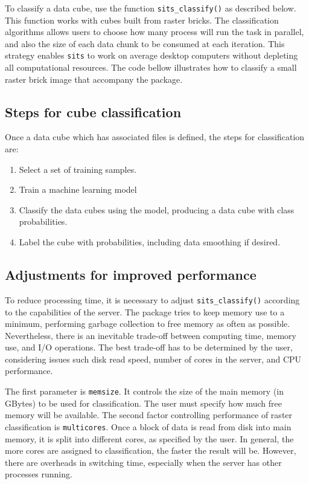 \documentclass[a4paper,]{tufte-book}
\providecommand{\tightlist}{%
  \setlength{\itemsep}{0pt}\setlength{\parskip}{0pt}}
\begin{document}
To classify a data cube, use the function \texttt{sits\_classify()} as described below. This function works with cubes built from raster bricks. The classification algorithms allows users to choose how many process will run the task in parallel, and also the size of each data chunk to be consumed at each iteration. This strategy enables \texttt{sits} to work on average desktop computers without depleting all computational resources. The code bellow illustrates how to classify a small raster brick image that accompany the package.

\hypertarget{steps-for-cube-classification}{%
\subsection{Steps for cube classification}\label{steps-for-cube-classification}}

Once a data cube which has associated files is defined, the steps for classification are:

\begin{enumerate}
\def\labelenumi{\arabic{enumi}.}
\tightlist
\item
  Select a set of training samples.
\item
  Train a machine learning model
\item
  Classify the data cubes using the model, producing a data cube with class probabilities.
\item
  Label the cube with probabilities, including data smoothing if desired.
\end{enumerate}

\hypertarget{adjustments-for-improved-performance}{%
\subsection{Adjustments for improved performance}\label{adjustments-for-improved-performance}}

To reduce processing time, it is necessary to adjust \texttt{sits\_classify()} according to the capabilities of the server. The package tries to keep memory use to a minimum, performing garbage collection to free memory as often as possible. Nevertheless, there is an inevitable trade-off between computing time, memory use, and I/O operations. The best trade-off has to be determined by the user, considering issues such disk read speed, number of cores in the server, and CPU performance.

The first parameter is \texttt{memsize}. It controls the size of the main memory (in GBytes) to be used for classification. The user must specify how much free memory will be available. The second factor controlling performance of raster classification is \texttt{multicores}. Once a block of data is read from disk into main memory, it is split into different cores, as specified by the user. In general, the more cores are assigned to classification, the faster the result will be. However, there are overheads in switching time, especially when the server has other processes running.
\end{document}
